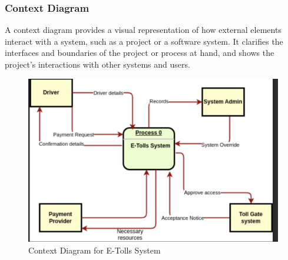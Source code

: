 \subsubsection{Context Diagram}
A context diagram provides a visual representation of how external elements interact with a system, such as a project or a software system. It clarifies the interfaces and boundaries of the project or process at hand, and shows the project’s interactions with other systems and users\cite{wysocki2006effective}.

\begin{figure}[h]
    \begin{center}
        \includegraphics[scale = 0.6]{images/context_diagram}
        \caption{Context Diagram for E-Tolls System}
    \end{center}
\end{figure}
